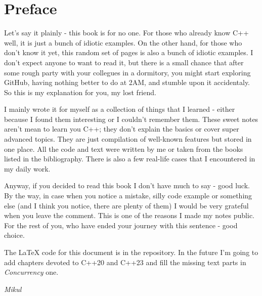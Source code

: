 \documentclass[../main]{subfiles}
\begin{document}
\chapter*{Preface}
    Let's say it plainly - this book is for no one. For those who
already know C++ well, it is just a bunch of idiotic examples.
On the other hand, for those who don't know it yet, this random set of pages
is also a bunch of idiotic examples. I don't expect anyone to want to
read it, but there is a small chance that after some rough party
with your collegues in a dormitory, you might start exploring GitHub,
having nothing better to do at 2AM, and stumble upon it accidentaly.
So this is my explanation for you, my lost friend.\newline

    I mainly wrote it for myself as a collection of things that I learned -
either because I found them interesting or I couldn't remember them.
These sweet notes aren't mean to learn you C++; they don't
explain the basics or cover super advanced topics. They are just compilation
of well-known features but stored in one place. All the code and text
were written by me or taken from the books listed in the bibliography.
There is also a few real-life cases that I encountered in my daily work.\newline

    Anyway, if you decided to read this book I don't have much to say - good luck.
By the way, in case when you notice a mistake, silly code example or something
else (and I think you notice, there are plenty of them) I would be very
grateful when you leave the comment. This is one of the reasons I made
my notes public. For the rest of you, who have ended your journey with this
sentence - good choice.\newline

   The \LaTeX\vspace{1pt} code for this document is in the repository.
In the future I'm going to add chapters devoted to C++20 and C++23 and
fill the missing text parts in \textit{Concurrency} one.

\begin{flushright}
    \textit{Mikul}
\end{flushright}
\end{document}
